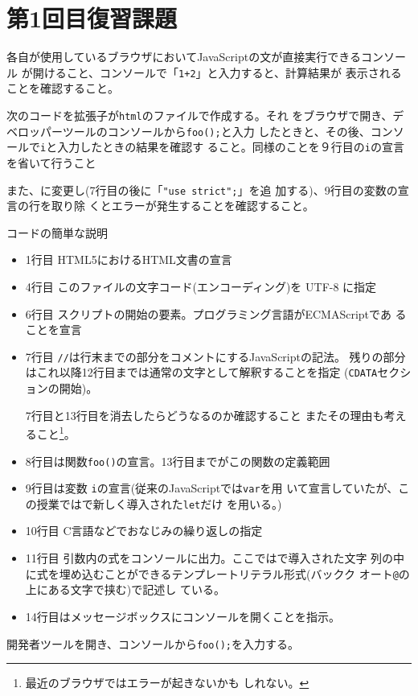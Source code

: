 \section{第1回目復習課題}
\begin{Prob}\upshape
 各自が使用しているブラウザにおいてJavaScriptの文が直接実行できるコンソール
 が開けること、コンソールで「\texttt{1+2}」と入力すると、計算結果が
 表示されることを確認すること。
\end{Prob}
\begin{Prob}\label{FisatJS}\upshape
 次のコードを拡張子が\Verb+html+のファイルで作成する。それ
 をブラウザで開き、デベロッパーツールのコンソールから\Verb+foo();+と入力
 したときと、その後、コンソールで\texttt{i}と入力したときの結果を確認す
 ること。{同様のことを９行目の\Verb+i+の宣言を省いて行うこと}

 また、\Strict に変更し(7行目の後に「\Verb+"use strict";+」を追
 加する)、9行目の変数の宣言の行を取り除
 くとエラーが発生することを確認すること。
\end{Prob}
コードの簡単な説明
\begin{itemize}
 \item 1行目 HTML5におけるHTML文書の宣言
 \item 4行目 このファイルの文字コード(エンコーディング)を UTF-8 に指定
 \item 6行目 スクリプトの開始の要素。プログラミング言語がECMAScriptであ
       ることを宣言
 \item 7行目 \texttt{//}は行末までの部分をコメントにするJavaScriptの記法。
残りの部分はこれ以降12行目までは通常の文字として解釈することを指定
       (\texttt{CDATA}セクションの開始)。

      7行目と13行目を消去したらどうなるのか確認すること
またその理由も考えること\footnote{最近のブラウザではエラーが起きないかも
       しれない。}。
 \item 8行目は関数\Verb+foo()+の宣言。13行目までがこの関数の定義範囲
 \item 9行目は変数 \texttt{i}の宣言(従来のJavaScriptでは\texttt{var}を用
       いて宣言していたが、この授業では\ES で新しく導入された\texttt{let}だけ
       を用いる。)
 \item 10行目 C言語などでおなじみの繰り返しの指定
 \item 11行目 引数内の式をコンソールに出力。ここでは\ES で導入された文字
       列の中に式を埋め込むことができるテンプレートリテラル形式(バックク
       オート\Verb+@+の上にある文字で挟む)で記述し
       ている。
 \item 14行目はメッセージボックスにコンソールを開くことを指示。
\end{itemize}
開発者ツールを開き、コンソールから\Verb+foo();+を入力する。


